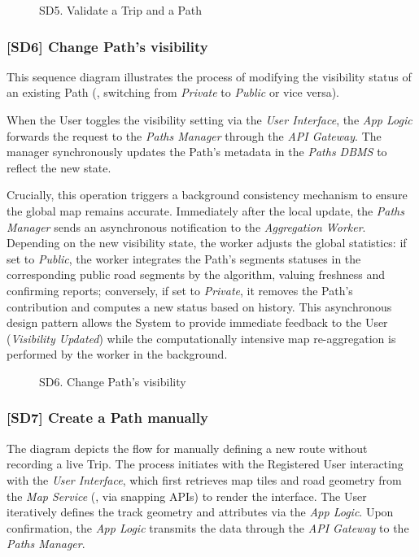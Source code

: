 \vspace{1cm}
\begin{figure}[hp]
    \centering
    
    \caption{SD5. Validate a Trip and a Path}
    \label{fig:SD5}
\end{figure}
\newpage
\subsubsection*{[SD6] Change Path's visibility}
This sequence diagram illustrates the process of modifying the visibility status of an existing Path (\eg, switching from \emph{Private} to \emph{Public} or vice versa).

When the User toggles the visibility setting via the \emph{User Interface}, the \emph{App Logic} forwards the request to the \emph{Paths Manager} through the \emph{API Gateway}. The manager synchronously updates the Path's metadata in the \emph{Paths DBMS} to reflect the new state.

Crucially, this operation triggers a background consistency mechanism to ensure the global map remains accurate. Immediately after the local update, the \emph{Paths Manager} sends an asynchronous notification to the \emph{Aggregation Worker}. Depending on the new visibility state, the worker adjusts the global statistics: if set to \emph{Public}, the worker integrates the Path's segments statuses in the corresponding public road segments by the algorithm, valuing freshness and confirming reports; conversely, if set to \emph{Private}, it removes the Path's contribution and computes a new status based on history. This asynchronous design pattern allows the System to provide immediate feedback to the User (\emph{Visibility Updated}) while the computationally intensive map re-aggregation is performed by the worker in the background.

\vspace{1cm}
\begin{figure}[hp]
    \centering
    
    \caption{SD6. Change Path's visibility}
    \label{fig:SD6}
\end{figure}
\newpage
\subsubsection*{[SD7] Create a Path manually}
The diagram depicts the flow for manually defining a new route without recording a live Trip. The process initiates with the Registered User interacting with the \emph{User Interface}, which first retrieves map tiles and road geometry from the \emph{Map Service} (\eg, via snapping APIs) to render the interface. The User iteratively defines the track geometry and attributes via the \emph{App Logic}. Upon confirmation, the \emph{App Logic} transmits the data through the \emph{API Gateway} to the \emph{Paths Manager}.

